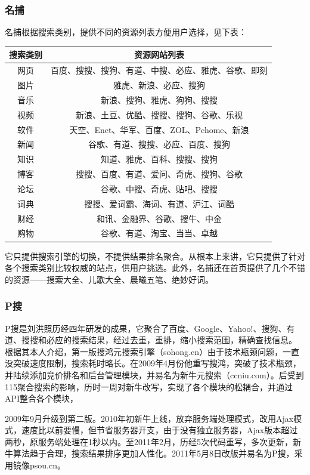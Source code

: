 \subsubsection{名捕}
名捕根据搜索类别，提供不同的资源列表方便用户选择，见下表：
\begin{table}[htbp]
\centering
\begin{tabular}{|c|c|}
    \hline\hline
    搜索类别 & 资源网站列表\\
    \hline
    网页 & 百度、搜搜、搜狗、有道、中搜、必应、雅虎、谷歌、即刻\\
    图片 & 雅虎、新浪、必应、搜狗\\
    音乐 & 新浪、搜狗、雅虎、狗狗、搜搜\\
    视频 & 新浪、土豆、优酷、搜搜、搜狗、谷歌、乐视\\
    软件 & 天空、Enet、华军、百度、ZOL、Pchome、新浪\\
    新闻 & 谷歌、有道、搜搜、必应、百度、搜狗\\
    知识 & 知道、雅虎、百科、搜搜、搜狗\\
    博客 & 搜搜、百度、有道、爱问、奇虎、搜狗、谷歌\\
    论坛 & 谷歌、中搜、奇虎、贴吧、搜搜\\
    词典 & 搜搜、爱词霸、海词、有道、沪江、词酷\\
    财经 & 和讯、金融界、谷歌、搜牛、中金\\
    购物 & 谷歌、有道、淘宝、当当、卓越\\
  \hline
\end{tabular}
\end{table}

它只提供搜索引擎的切换，不提供结果排名聚合。从根本上来讲，它只提供了针对各个搜索类别比较权威的站点，供用户挑选。此外，名捕还在首页提供了几个不错的资源——搜索大全、儿歌大全、晨曦五笔、绝妙好词。

\subsubsection{P搜}
P搜是刘洪照历经四年研发的成果，它聚合了百度、Google、Yahoo!、搜狗、有道、搜搜和必应的搜索结果，经过去重，重排，缩小搜索范围，精确查找信息。
根据其本人介绍，第一版搜鸿元搜索引擎（sohong.cn）由于技术瓶颈问题，一直没突破速度限制，搜索耗时略长。在2009年4月份他重写搜鸿，突破了技术瓶颈，并陆续添加竞价排名和后台管理模块，并易名为新牛元搜索（ccniu.com）。后受到115聚合搜索的影响，历时一周对新牛改写，实现了各个模块的松耦合，并通过API整合各个模块，

2009年9月升级到第二版。2010年初新牛上线，放弃服务端处理模式，改用Ajax模式，速度比以前要慢，但节省服务器开支，由于没有独立服务器，Ajax版本超过两秒，原服务端处理在1秒以内。至2011年2月，历经5次代码重写，多次更新，新牛算法趋于合理，搜索结果排序更加人性化。2011年5月8日改版并易名为P搜，采用镜像psou.cn。

